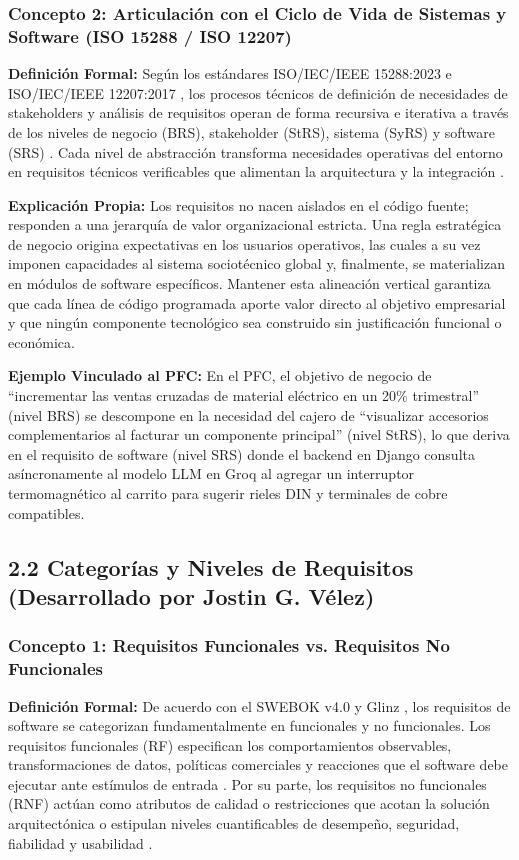 \subsubsection{Concepto 2: Articulación con el Ciclo de Vida de Sistemas y Software (ISO 15288 / ISO 12207)}
\textbf{Definición Formal:} Según los estándares ISO/IEC/IEEE 15288:2023 \cite{ieee15288} e ISO/IEC/IEEE 12207:2017 \cite{ieee12207}, los procesos técnicos de definición de necesidades de stakeholders y análisis de requisitos operan de forma recursiva e iterativa a través de los niveles de negocio (BRS), stakeholder (StRS), sistema (SyRS) y software (SRS) \cite{ieee29148}. Cada nivel de abstracción transforma necesidades operativas del entorno en requisitos técnicos verificables que alimentan la arquitectura y la integración \cite{ieee12207, hull2011}.

\textbf{Explicación Propia:} Los requisitos no nacen aislados en el código fuente; responden a una jerarquía de valor organizacional estricta. Una regla estratégica de negocio origina expectativas en los usuarios operativos, las cuales a su vez imponen capacidades al sistema sociotécnico global y, finalmente, se materializan en módulos de software específicos. Mantener esta alineación vertical garantiza que cada línea de código programada aporte valor directo al objetivo empresarial y que ningún componente tecnológico sea construido sin justificación funcional o económica.

\textbf{Ejemplo Vinculado al PFC:} En el PFC, el objetivo de negocio de ``incrementar las ventas cruzadas de material eléctrico en un 20\% trimestral'' (nivel BRS) se descompone en la necesidad del cajero de ``visualizar accesorios complementarios al facturar un componente principal'' (nivel StRS), lo que deriva en el requisito de software (nivel SRS) donde el backend en Django consulta asíncronamente al modelo LLM en Groq al agregar un interruptor termomagnético al carrito para sugerir rieles DIN y terminales de cobre compatibles.

\subsection{2.2 Categorías y Niveles de Requisitos (Desarrollado por Jostin G. Vélez)}

\subsubsection{Concepto 1: Requisitos Funcionales vs. Requisitos No Funcionales}
\textbf{Definición Formal:} De acuerdo con el SWEBOK v4.0 \cite{swebok2024} y Glinz \cite{glinz2007nfr}, los requisitos de software se categorizan fundamentalmente en funcionales y no funcionales. Los requisitos funcionales (RF) especifican los comportamientos observables, transformaciones de datos, políticas comerciales y reacciones que el software debe ejecutar ante estímulos de entrada \cite{pohl2025, swebok2024}. Por su parte, los requisitos no funcionales (RNF) actúan como atributos de calidad o restricciones que acotan la solución arquitectónica o estipulan niveles cuantificables de desempeño, seguridad, fiabilidad y usabilidad \cite{iso25010, glinz2007nfr}.

